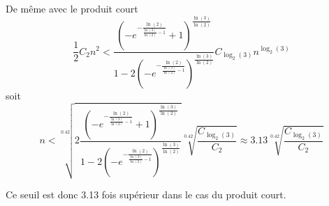 De même avec le produit court
\[
    \frac{1}{2}C_2n^2 < \frac{\left ( -e^{-\frac{\ln(2)}{\frac{\ln(3)}{\ln(2)}-1}}+1\right)^{\frac{\ln(3)}{\ln(2)}}}{1-2\left ( -e^{-\frac{\ln(2)}{\frac{\ln(3)}{\ln(2)}-1}}\right)^{\frac{\ln(3)}{\ln(2)}}} C_{\log_2(3)}n^{\log_2(3)}
\]
soit
\[
    n < \sqrt[0.42]{2\frac{\left ( -e^{-\frac{\ln(2)}{\frac{\ln(3)}{\ln(2)}-1}}+1\right)^{\frac{\ln(3)}{\ln(2)}}}{1-2\left ( -e^{-\frac{\ln(2)}{\frac{\ln(3)}{\ln(2)}-1}}\right)^{\frac{\ln(3)}{\ln(2)}}}} \sqrt[0.42]{\frac{C_{\log_2(3)}}{C_2}} \approx 3.13 \sqrt[0.42]{\frac{C_{\log_2(3)}}{C_2}}
\]

Ce seuil est donc 3.13 fois supérieur dans le cas du produit court.



